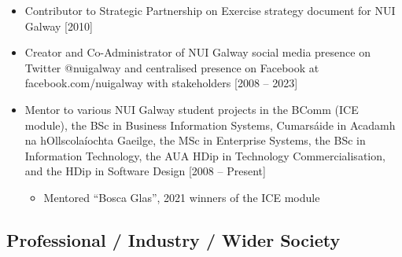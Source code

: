 \documentclass[10pt,a4paper]{res} %
\begin{document}
\begin{resume}
\begin{itemize}
\item Contributor to Strategic Partnership on Exercise strategy document for NUI Galway [2010]
\item Creator and Co-Administrator of NUI Galway social media presence on Twitter @nuigalway and centralised presence on Facebook at facebook.com/nuigalway with stakeholders [2008 -- 2023]
\item Mentor to various NUI Galway student projects in the BComm (ICE module), the BSc in Business Information Systems, Cumars\'{a}ide in Acadamh na hOllscola\'{i}ochta Gaeilge, the MSc in Enterprise Systems, the BSc in Information Technology, the AUA HDip in Technology Commercialisation, and the HDip in Software Design [2008 -- Present]
\begin{itemize} \itemsep -2pt
\item Mentored ``Bosca Glas'', 2021 winners of the ICE module
\end{itemize}
\end{itemize}

\subsection*{Professional / Industry / Wider Society}


\end{resume}
\end{document}

